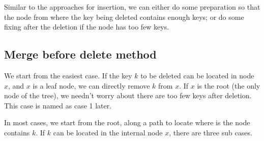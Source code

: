 \documentclass[UTF8]{article}
\begin{document}
Similar to the approaches for insertion, we can either do some preparation
so that the node from where the key being deleted contains enough
keys; or do some fixing after the deletion if the node has too few keys.


\subsection{Merge before delete method}

We start from the easiest case. If the key $k$ to be deleted
can be located in node $x$, and $x$ is a leaf node,
we can directly remove $k$ from $x$. If $x$ is the root (the only
node of the tree), we needn't worry about there are too few
keys after deletion. This case is named as case 1 later.

In most cases, we start from the root, along a path to locate
where is the node contains $k$. If $k$ can be located in the
internal node $x$, there are three sub cases.
\end{document}
